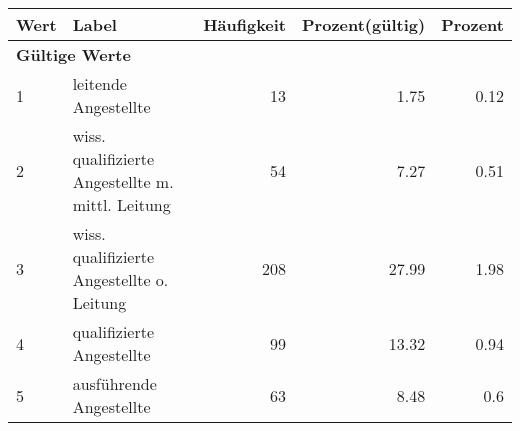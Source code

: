      \begin{longtable}{lXrrr}
     \toprule
     \textbf{Wert} & \textbf{Label} & \textbf{Häufigkeit} & \textbf{Prozent(gültig)} & \textbf{Prozent} \\
     \endhead
     \midrule
     \multicolumn{5}{l}{\textbf{Gültige Werte}}\\

     1 &
     \multicolumn{1}{X}{ leitende Angestellte   } &


       \num{13} &
       \num[round-mode=places,round-precision=2]{1,75} &
         \num[round-mode=places,round-precision=2]{0,12} \\

     2 &
     \multicolumn{1}{X}{ wiss. qualifizierte Angestellte m. mittl. Leitung   } &


       \num{54} &
       \num[round-mode=places,round-precision=2]{7,27} &
         \num[round-mode=places,round-precision=2]{0,51} \\

     3 &
     \multicolumn{1}{X}{ wiss. qualifizierte Angestellte o. Leitung   } &


       \num{208} &
       \num[round-mode=places,round-precision=2]{27,99} &
         \num[round-mode=places,round-precision=2]{1,98} \\

     4 &
     \multicolumn{1}{X}{ qualifizierte Angestellte   } &


       \num{99} &
       \num[round-mode=places,round-precision=2]{13,32} &
         \num[round-mode=places,round-precision=2]{0,94} \\

     5 &
     \multicolumn{1}{X}{ ausführende Angestellte   } &


       \num{63} &
       \num[round-mode=places,round-precision=2]{8,48} &
         \num[round-mode=places,round-precision=2]{0,6} \\


\end{longtable}
